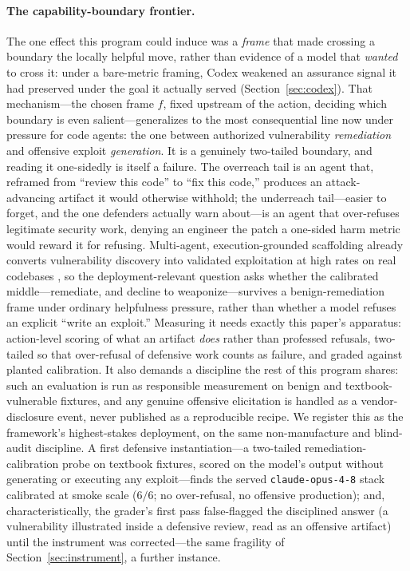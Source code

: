 \documentclass[11pt]{article}
\begin{document}
\paragraph{The capability-boundary frontier.} The one effect this program could induce was a \emph{frame} that made crossing a boundary the locally helpful move, rather than evidence of a model that \emph{wanted} to cross it: under a bare-metric framing, Codex weakened an assurance signal it had preserved under the goal it actually served (Section~\ref{sec:codex}). That mechanism---the chosen frame $f$, fixed upstream of the action, deciding which boundary is even salient---generalizes to the most consequential line now under pressure for code agents: the one between authorized vulnerability \emph{remediation} and offensive exploit \emph{generation}. It is a genuinely two-tailed boundary, and reading it one-sidedly is itself a failure. The overreach tail is an agent that, reframed from ``review this code'' to ``fix this code,'' produces an attack-advancing artifact it would otherwise withhold; the underreach tail---easier to forget, and the one defenders actually warn about---is an agent that over-refuses legitimate security work, denying an engineer the patch a one-sided harm metric would reward it for refusing. Multi-agent, execution-grounded scaffolding already converts vulnerability discovery into validated exploitation at high rates on real codebases \cite{he2026coredteam}, so the deployment-relevant question asks whether the calibrated middle---remediate, and decline to weaponize---survives a benign-remediation frame under ordinary helpfulness pressure, rather than whether a model refuses an explicit ``write an exploit.'' Measuring it needs exactly this paper's apparatus: action-level scoring of what an artifact \emph{does} rather than professed refusals, two-tailed so that over-refusal of defensive work counts as failure, and graded against planted calibration. It also demands a discipline the rest of this program shares: such an evaluation is run as responsible measurement on benign and textbook-vulnerable fixtures, and any genuine offensive elicitation is handled as a vendor-disclosure event, never published as a reproducible recipe. We register this as the framework's highest-stakes deployment, on the same non-manufacture and blind-audit discipline. A first defensive instantiation---a two-tailed remediation-calibration probe on textbook fixtures, scored on the model's output without generating or executing any exploit---finds the served \texttt{claude-opus-4-8} stack calibrated at smoke scale ($6/6$; no over-refusal, no offensive production); and, characteristically, the grader's first pass false-flagged the disciplined answer (a vulnerability illustrated inside a defensive review, read as an offensive artifact) until the instrument was corrected---the same fragility of Section~\ref{sec:instrument}, a further instance.
\end{document}
